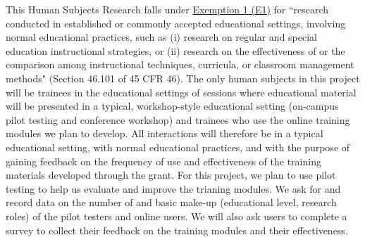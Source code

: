 \documentclass[pdftex,english,11.5pt,parskip=half]{scrartcl}
\begin{document}
This Human Subjects Research falls under \underline{Exemption 1 (E1)} for ``research conducted in established or commonly accepted educational settings, involving normal educational practices, such as (i) research on regular and special education instructional strategies, or (ii) research on the effectiveness of or the comparison among instructional techniques, curricula, or classroom management methods" (Section 46.101 of 45 CFR 46). The only human subjects in this project will be trainees in the educational settings of sessions where educational material will be presented in a typical, workshop-style educational setting (on-campus pilot testing and conference workshop) and trainees who use the online training modules we plan to develop. All interactions will therefore be in a typical educational setting, with normal educational practices, and with the purpose of gaining feedback on the frequency of use and effectiveness of the training materials developed through the grant. For this project, we plan to use pilot testing to help us evaluate and improve the trianing modules. We ask for and record data on the number of and basic make-up (educational level, research roles) of the pilot testers and online users. We will also ask users to complete a survey to collect their feedback on the training modules and their effectiveness. 
\end{document}
